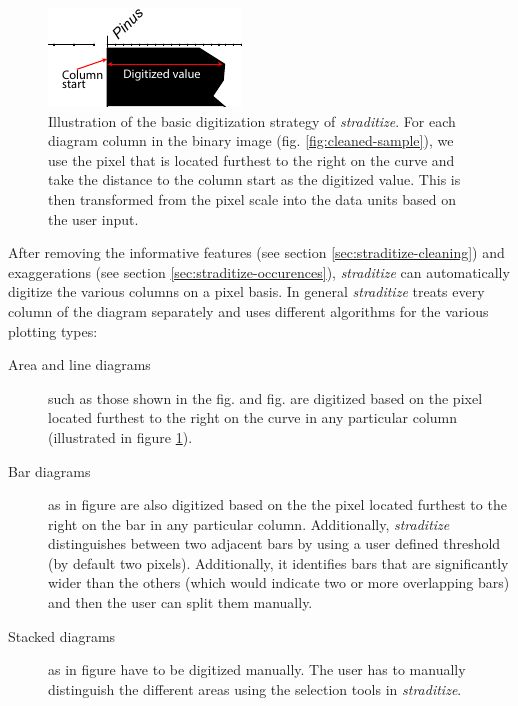 \documentclass[
11pt, %
english, %
singlespacing, %
headsepline, %
]{MastersDoctoralThesis} %
\begin{document}
\begin{NoHyper}
\begin{refsection}
\begin{figure}
	\centering
	\includegraphics[width=0.5\linewidth]{straditize-figures/sample_diagram_digitize-explanation.pdf}
	\caption[Illustration of the basic digitization strategy of \emph{straditize}]{Illustration of the basic digitization strategy of \emph{straditize}. For each diagram column in the binary image (fig. \ref{fig:cleaned-sample}), we use the pixel that is located furthest to the right on the curve and take the distance to the column start as the digitized value. This is then transformed from the pixel scale into the data units based on the user input.}
	\label{fig:digitize-explanation}
\end{figure}

After removing the informative features (see section \ref{sec:straditize-cleaning}) and exaggerations (see section \ref{sec:straditize-occurences}), \emph{straditize} can automatically digitize the various columns on a pixel basis. In general \emph{straditize} treats every column of the diagram separately and uses different algorithms for the various plotting types:

\begin{description}
	\item[Area and line diagrams] such as those shown in the fig. \samplediagram[f] and fig. \samplediagram[h]  are  digitized  based  on  the  pixel located furthest to the right on the curve in any particular column (illustrated in figure \ref{fig:digitize-explanation}).
	\item[Bar diagrams] as in figure \samplediagram[g] are also digitized based on the the pixel located furthest to the right on the bar in any particular column. Additionally, \emph{straditize} distinguishes between two adjacent bars by using a user defined threshold (by default two pixels). Additionally, it identifies bars that are significantly wider than the others (which would indicate two or more overlapping bars) and then the user can split them manually.
	\item[Stacked diagrams] as in figure \samplediagram[i] have to be digitized manually. The user has to manually distinguish the different areas using the selection tools in \emph{straditize}.
\end{description}


\end{refsection}
\end{NoHyper}
\end{document}
